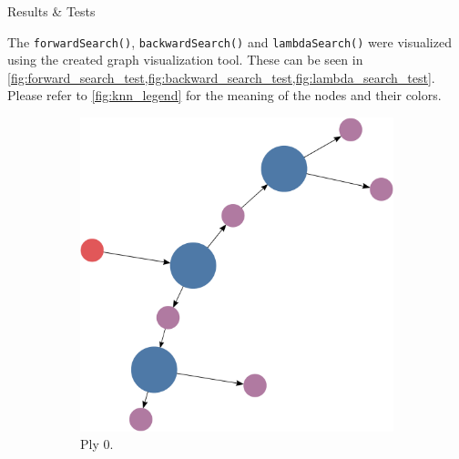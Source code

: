 \documentclass[final]{beamer} %
\newcommand{\code}[1]{\texttt{#1}}
\begin{document}
\begin{frame}
\begin{columns}
\begin{column}{.33\textwidth}
{\begin{block}{Results \& Tests}
					\parbox{0.99\textwidth}{The \code{forwardSearch()}, \code{backwardSearch()} and \code{lambdaSearch()} were visualized using the created graph visualization tool. These can be seen in \cref{fig:forward_search_test,fig:backward_search_test,fig:lambda_search_test}. Please refer to \cref{fig:knn_legend} for the meaning of the nodes and their colors.}
					
					\begin{figure}
						\begin{subfigure}[!htb]{0.32\columnwidth}
							\centering
							\includegraphics[width=\columnwidth]{figures/knn_simple_forward_think_0.pdf}
							\caption{Ply 0.}
						\end{subfigure}
						\begin{subfigure}[!htb]{0.32\columnwidth}
							\centering

\end{subfigure}
\end{figure}
\end{block}}
\end{column}
\end{columns}
\end{frame}
\end{document}
